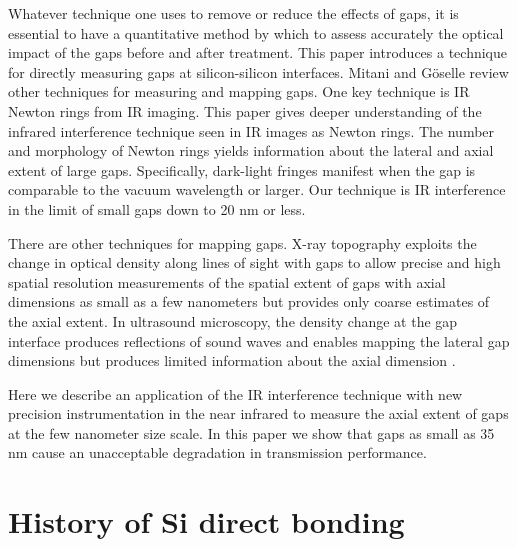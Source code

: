 \documentclass[osajnl,preprint,showpacs,superscriptaddress,12pt]{revtex4-1} %
\begin{document}
Whatever technique one uses to remove or reduce the effects of gaps, it is essential to have a quantitative method by which to assess accurately the optical impact of the gaps before and after treatment.  This paper introduces a technique for directly measuring gaps at silicon-silicon interfaces.  Mitani and G\"oselle review other techniques for measuring and mapping gaps\cite{1992JEMat..21..669M}.  One key technique is IR Newton rings from IR imaging\cite{Mitani1990}.  This paper gives deeper understanding of the infrared interference technique seen in IR images as Newton rings.  The number and morphology of Newton rings yields information about the lateral and axial extent of large gaps. Specifically, dark-light fringes manifest when the gap is comparable to the vacuum wavelength or larger.  Our technique is IR interference in the limit of small gaps down to 20 nm or less.  

There are other techniques for mapping gaps.  X-ray topography \cite{1992JEMat..21..669M,1994JaJAP..33....6H} exploits the change in optical density along lines of sight with gaps to allow precise and high spatial resolution measurements of the spatial extent of gaps with axial dimensions as small as a few nanometers but provides only coarse estimates of the axial extent.  In ultrasound microscopy, the density change at the gap interface produces reflections of sound waves and enables mapping the lateral gap dimensions but produces limited information about the axial dimension \cite{2000RScI...71.1869G}.  

Here we describe an application of the IR interference technique with new precision instrumentation in the near infrared to measure the axial extent of gaps at the few nanometer size scale.  In this paper we show that gaps as small as 35 nm cause an unacceptable degradation in transmission performance.  


\section{History of Si direct bonding}
\label{secHistory}
\end{document}
